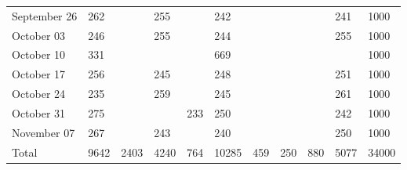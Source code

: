 \begin{table}[!h]
{\begin{tabular}[t]{lllllllllll}
September 26 & 262 &  & 255 &  & 242 &  &  &  & 241 & 1000\\
October 03 & 246 &  & 255 &  & 244 &  &  &  & 255 & 1000\\
October 10 & 331 &  &  &  & 669 &  &  &  &  & 1000\\
\addlinespace
October 17 & 256 &  & 245 &  & 248 &  &  &  & 251 & 1000\\
October 24 & 235 &  & 259 &  & 245 &  &  &  & 261 & 1000\\
October 31 & 275 &  &  & 233 & 250 &  &  &  & 242 & 1000\\
November 07 & 267 &  & 243 &  & 240 &  &  &  & 250 & 1000\\
Total & 9642 & 2403 & 4240 & 764 & 10285 & 459 & 250 & 880 & 5077 & 34000\\
\bottomrule
\end{tabular}}
\end{table}
